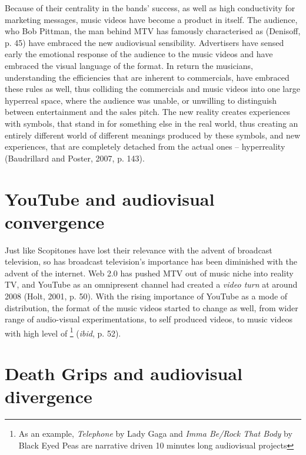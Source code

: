\documentclass[a4paper, 11pt]{article}
\begin{document}
 Because of their centrality in the bands’ success, as well as high conductivity for marketing messages, music videos have become a product in itself. The audience, who Bob Pittman, the man behind MTV has famously characterised as  (Denisoff, p. 45) have embraced the new audiovisual sensibility. Advertisers have sensed early the emotional response of the audience to the music videos and have embraced the visual language of the format. In return the musicians, understanding the efficiencies that are inherent to commercials, have embraced these rules as well, thus colliding the commercials and music videos into one large hyperreal space, where the audience was unable, or unwilling to distinguish between entertainment and the sales pitch. The new reality creates experiences with symbols, that stand in for something else in the real world, thus creating an entirely different world of different meanings produced by these symbols, and new experiences, that are completely detached from the actual ones – hyperreality (Baudrillard and Poster, 2007, p. 143).

\section{YouTube and audiovisual convergence}
Just like Scopitones have lost their relevance with the advent of broadcast television, so has broadcast television’s importance has been diminished with the advent of the internet. Web 2.0 has pushed MTV out of music niche into reality TV, and YouTube as an omnipresent channel had created a \textit{video turn} at around 2008 (Holt, 2001, p. 50). With the rising importance of YouTube as a mode of distribution, the format of the music videos started to change as well, from wider range of audio-visual experimentations, to self produced videos, to music videos with high level of \footnote{As an example, \textit{Telephone} by Lady Gaga and \textit{Imma Be/Rock That Body} by Black Eyed Peas are narrative driven 10 minutes long audiovisual projects} (\textit{ibid}, p. 52).

\section{Death Grips and audiovisual divergence}
\end{document}
